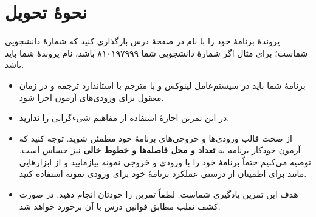 \documentclass{utap}
\begin{document}
\section{نحوهٔ تحویل}
    پروندهٔ برنامهٔ خود را با نام  در صفحهٔ  درس بارگذاری کنید که  شمارهٔ دانشجویی شماست؛ برای مثال اگر شمارهٔ دانشجویی شما ۸۱۰۱۹۷۹۹۹ باشد، نام پروندهٔ شما باید  باشد.
    \begin{itemize}
        \item
برنامهٔ شما باید در سیستم‌عامل لینوکس و با مترجم  با استاندارد  ترجمه و در زمان معقول برای ورودی‌های آزمون اجرا شود.
        \item
در این تمرین اجازهٔ استفاده از مفاهیم شیءگرایی را \textbf{ندارید}.
        \item
از صحت قالب ورودی‌ها و خروجی‌های برنامهٔ خود مطمئن شوید. توجه کنید که آزمون خودکار برنامه به \textbf{تعداد و محل فاصله‌ها و خطوط خالی} نیز حساس است. توصیه می‌کنیم حتماً برنامهٔ خود را با ورودی و خروجی نمونه بیازمایید و از ابزارهایی مانند  برای اطمینان از درستی عملکرد برنامهٔ خود برای ورودی نمونه استفاده کنید.
        \item
هدف این تمرین یادگیری شماست. لطفاً تمرین را خودتان انجام دهید. در صورت کشف تقلب مطابق قوانین درس با آن برخورد خواهد شد.
    \end{itemize}
\end{document}
